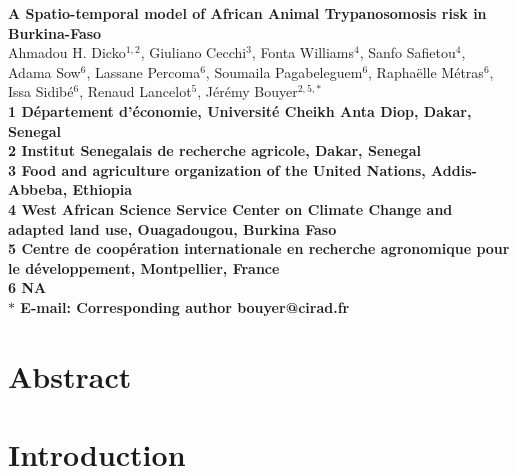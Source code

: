\documentclass[10pt]{article}
\date{}
\title{}
\begin{document}
\begin{flushleft}
{\Large
{\bfseries A Spatio-temporal model of African Animal Trypanosomosis risk in Burkina-Faso}
}\\


Ahmadou H. Dicko$^{1,2}$, 
Giuliano Cecchi$^{3}$, 
Fonta Williams$^{4}$, 
Sanfo Safietou$^{4}$, 
Adama Sow$^{6}$, 
Lassane Percoma$^{6}$, 
Soumaila Pagabeleguem$^{6}$,
Rapha\"{e}lle M\'{e}tras$^{6}$,
Issa Sidib\'{e}$^{6}$,
Renaud Lancelot$^{5}$,
J\'{e}r\'{e}my Bouyer$^{2,5,\ast}$
\\
\bf{1} D\'{e}partement d'\'{e}conomie, Universit\'{e} Cheikh Anta Diop, Dakar, Senegal
\\
\bf{2} Institut Senegalais de recherche agricole, Dakar, Senegal
\\
\bf{3} Food and agriculture organization of the United Nations, Addis-Abbeba, Ethiopia
\\
\bf{4} West African Science Service Center on Climate Change and adapted land use, Ouagadougou, Burkina Faso
\\
\bf{5} Centre de coop\'{e}ration internationale en recherche agronomique pour le d\'{e}veloppement, Montpellier, France
\\
\bf{6} NA
\\
$\ast$ E-mail: Corresponding author bouyer@cirad.fr
\end{flushleft}


\section*{Abstract}
\label{unnumbered-1}
\section*{Introduction}
\label{unnumbered-2}
\end{document}
